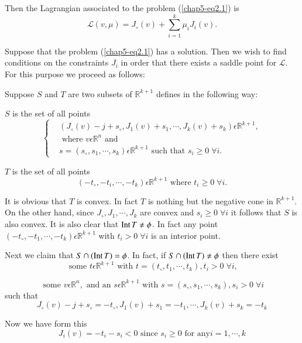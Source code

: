 Then the Lagrangian associated to the problem (\ref{chap5-eq2.1}) is
$$
\mathscr{L} (v, \mu) = J_{\circ}(v) + \sum_{i=1}^{k} \mu_{i} J_{i} (v).
$$

Suppose that the problem (\ref{chap5-eq2.1}) has a solution. Then we wish to find conditions on the constraints $J_{i}$ in order that there exists a saddle point for $\mathscr{L}$. For this purpose we proceed as follows:

Suppose $S$ and $T$ are two subsets of $\mathbb{R}^{k+1}$ defines in the following way:

$S$ is the set of all points
\begin{equation*}
\begin{cases}
& (J_{\circ}(v) - j + s_{\circ}, J_{1}(v) + s_{1}, \cdots, J_{k}(v) + s_{k}) \epsilon \mathbb{R}^{k+1},\\
& \text{ where } v \epsilon \mathbb{R}^{n} \text{ and }\\
& s = (s_{\circ}, s_{1}, \cdots, s_{k}) \epsilon \mathbb{R}^{k+1} \text{ such that } s_{i} \geq 0 \; \forall i.
\end{cases}
\end{equation*}

$T$ is the set of all points
$$
(-t_{\circ}, -t_{i}, \cdots, -t_{k}) \epsilon \mathbb{R}^{k+1} \text{ where } t_{i} \geq 0 \; \forall i.
$$

It is obvious that $T$ is convex. In fact $T$ is nothing but the negative cone in $\mathbb{R}^{k+1}$. On the other hand, since $J_{\circ}, J_{1}, \cdots, J_{k}$ are convex and $s_{i} \geq 0 \; \forall i$ it follows that $S$ is also convex. It is also clear that $\operatorname*{Int} T \neq \phi$. In fact any point $(-t_{\circ}, -t_{1}, \cdots, -t_{k}) \epsilon \mathbb{R}^{k+1}$ with $t_{i} > 0 \; \forall i$ is an interior point.

Next we claim that $S \cap (\operatorname*{Int} T) = \phi$. In fact, if $S \cap (\operatorname*{Int} T) \neq \phi$ then there exist
$$
\text{ some } t \epsilon \mathbb{R}^{k+1} \text{ with } t = (t_{\circ}, t_{1}, \cdots, t_{k}), t_{i} > 0 \; \forall i,
$$\pageoriginale

$$
\text{ some } v \epsilon \mathbb{R}^{n}, \text{ and an } s \epsilon \mathbb{R}^{k+1} \text{ with } s = (s_{\circ}, s_{1}, \cdots, s_{k}), s_{i} > 0 \;  \forall i
$$ 
such that
$$
J_{\circ}(v) - j+s_{\circ} = -t_{\circ}, J_{1}(v) + s_{1} = -t_{1}, \cdots, J_{k}(v) + s_{k} = -t_{k}
$$

Now we have form this
$$
J_{i}(v) = -t_{i} - s_{i} < 0 \text{ since } s_{i} \geq 0 \text{ for any} i = 1, \cdots, k
$$

